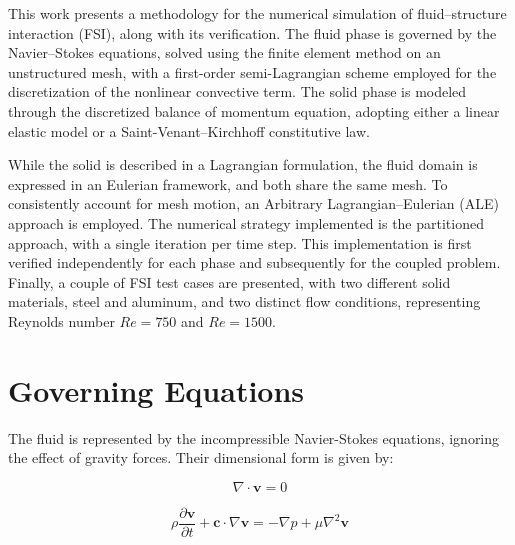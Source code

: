 \documentclass{article}
\begin{document}
This work presents a methodology for the numerical simulation of fluid–structure interaction (FSI), along with its verification. The fluid phase is governed by the Navier–Stokes equations, solved using the finite element method on an unstructured mesh, with a first-order semi-Lagrangian scheme employed for the discretization of the nonlinear convective term. The solid phase is modeled through the discretized balance of momentum equation, adopting either a linear elastic model or a Saint-Venant–Kirchhoff constitutive law.

While the solid is described in a Lagrangian formulation, the fluid domain is expressed in an Eulerian framework, and both share the same mesh. To consistently account for mesh motion, an Arbitrary Lagrangian–Eulerian (ALE) approach is employed. The numerical strategy implemented is the partitioned approach, with a single iteration per time step. This implementation is first verified independently for each phase and subsequently for the coupled problem. Finally, a couple of FSI test cases are presented, with two different solid materials, steel and aluminum, and two distinct flow conditions, representing Reynolds number $Re=750$ and $Re=1500$.


\section{Governing Equations}

The fluid is represented by the incompressible Navier-Stokes equations, ignoring the effect of gravity forces. Their dimensional form is given by:

\begin{equation}
	\nabla \cdot \mathbf{v} = 0
\end{equation}

\begin{equation}	
	\rho \frac{\partial \mathbf{v}}{\partial t}
	+ \mathbf{c} \cdot \nabla \mathbf{v}
	= -\nabla p
	+ \mu \nabla^2 \mathbf{v}
	\label{eq:Momentum}
\end{equation} \\
\end{document}
